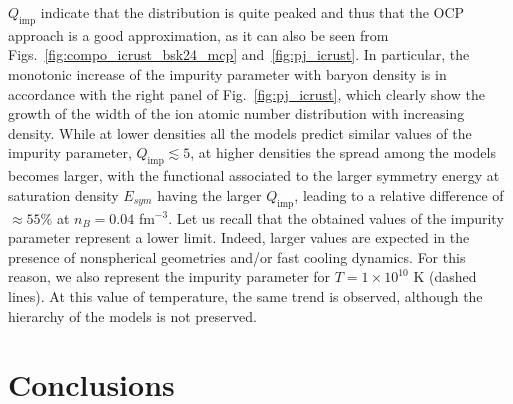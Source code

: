 $Q_{\text{imp}}$ indicate that the distribution is quite peaked and thus that 
the OCP approach is a good approximation, as it can also be seen from
Figs.~\ref{fig:compo_icrust_bsk24_mcp} and~\ref{fig:pj_icrust}. In particular, 
the monotonic increase of the impurity parameter with baryon density is in 
accordance with the right panel of Fig.~\ref{fig:pj_icrust}, which clearly show 
the growth of the width of the ion atomic number distribution with increasing 
density. 
%
While at lower densities all the models predict similar values of the impurity 
parameter, $Q_{\text{imp}} \lesssim 5$, at higher densities the spread among 
the models becomes larger, with the functional associated to the larger 
symmetry energy at saturation density $E_{sym}$ having the larger 
$Q_{\text{imp}}$, leading to a relative difference of $\approx 55\%$ at $n_B
= 0.04$ fm$^{-3}$. 
Let us recall that the obtained values of the impurity parameter represent a
lower limit. Indeed, larger values are expected in the presence of nonspherical
geometries and/or fast cooling dynamics. For this reason, we also represent the
impurity parameter for $T= 1\times 10^{10}$ K (dashed 
lines). At this value of temperature, the same trend is observed, although the 
hierarchy of the models is not preserved.

\section{Conclusions}\label{sec:conclu3}

